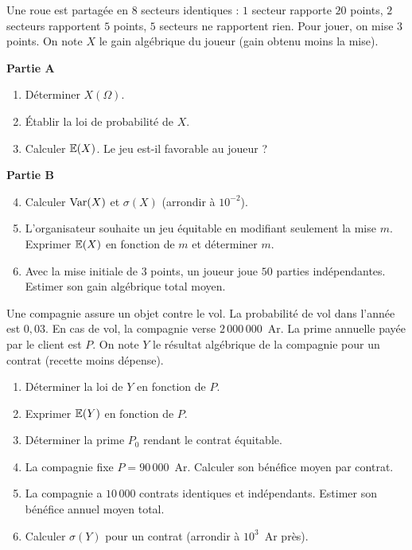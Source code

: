 Une roue est partagée en $8$ secteurs identiques : $1$ secteur rapporte
$20$ points, $2$ secteurs rapportent $5$ points, $5$ secteurs ne rapportent
rien. Pour jouer, on mise $3$ points. On note $X$ le gain algébrique du
joueur (gain obtenu moins la mise).

\textbf{Partie A}
\begin{enumerate}
	\item Déterminer $X(\Omega)$.
	\item Établir la loi de probabilité de $X$.
	\item Calculer $\mathbb{E}(X)$. Le jeu est-il favorable au joueur ?
\end{enumerate}

\textbf{Partie B}
\begin{enumerate}
	\setcounter{enumi}{3}
	\item Calculer $\mathrm{Var}(X)$ et $\sigma(X)$ (arrondir à $10^{-2}$).
	\item L'organisateur souhaite un jeu équitable en modifiant seulement la
	mise $m$. Exprimer $\mathbb{E}(X)$ en fonction de $m$ et déterminer $m$.
	\item Avec la mise initiale de $3$ points, un joueur joue $50$ parties
	indépendantes. Estimer son gain algébrique total moyen.
\end{enumerate}

Une compagnie assure un objet contre le vol. La probabilité de vol dans
l'année est $0{,}03$. En cas de vol, la compagnie verse $2\,000\,000$~Ar. La
prime annuelle payée par le client est $P$. On note $Y$ le résultat
algébrique de la compagnie pour un contrat (recette moins dépense).
\begin{enumerate}
	\item Déterminer la loi de $Y$ en fonction de $P$.
	\item Exprimer $\mathbb{E}(Y)$ en fonction de $P$.
	\item Déterminer la prime $P_0$ rendant le contrat équitable.
	\item La compagnie fixe $P = 90\,000$~Ar. Calculer son bénéfice moyen par
	contrat.
	\item La compagnie a $10\,000$ contrats identiques et indépendants.
	Estimer son bénéfice annuel moyen total.
	\item Calculer $\sigma(Y)$ pour un contrat (arrondir à $10^{3}$~Ar près).
\end{enumerate}


